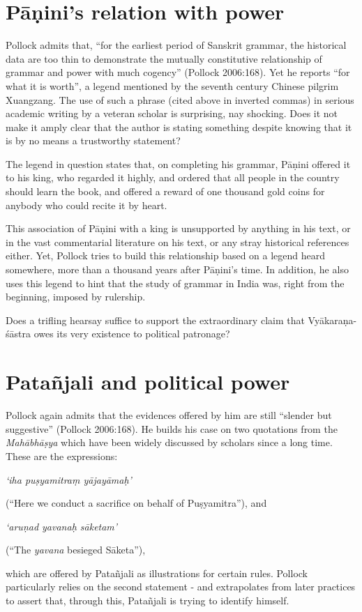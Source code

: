 \section{Pāṇini’s relation with power}\label{chap3-sec8}

Pollock admits that, ``for the earliest period of Sanskrit grammar, the historical data are too thin to demonstrate the mutually constitutive relationship of grammar and power with much cogency'' (Pollock 2006:168). Yet he reports ``for what it is worth'', a legend mentioned by the seventh century Chinese pilgrim Xuangzang. The use of such a phrase (cited above in inverted commas) in serious academic writing by a veteran scholar is surprising, nay shocking. Does it not make it amply clear that the author is stating something despite knowing that it is by no means a trustworthy statement? 

The legend in question states that, on completing his grammar, Pāṇini offered it to his king, who regarded it highly, and ordered that all people in the country should learn the book, and offered a reward of one thousand gold coins for anybody who could recite it by heart. 

This association of Pāṇini with a king is unsupported by anything in his text, or in the vast commentarial literature on his text, or any stray historical references either. Yet, Pollock tries to build this relationship based on a legend heard somewhere, more than a thousand years after Pāṇini's time. In addition, he also uses this legend to hint that the study of grammar in India was, right from the beginning, imposed by rulership. 

Does a trifling hearsay suffice to support the extraordinary claim that Vyākaraṇa-śāstra owes its very existence to political patronage?

\section{Patañjali and political power}\label{chap3-sec9}

Pollock again admits that the evidences offered by him are still ``slender but suggestive'' (Pollock 2006:168). He builds his case on two quotations from the {\sl Mahābhāṣya} which have been widely discussed by scholars since a long time. These are the expressions: 
\begin{myquote}
{{\sl `iha puṣyamitraṃ yājayāmaḥ'}}

(``Here we conduct a sacrifice on behalf of Puṣyamitra''), and

{{\sl `aruṇad yavanaḥ sāketam'}}

(``The {\sl yavana} besieged Sāketa''),
\end{myquote}
which are offered by Patañjali as illustrations for certain rules. Pollock particularly relies on the second statement - and extrapolates from later practices to assert that, through this, Patañjali is trying to identify himself.

